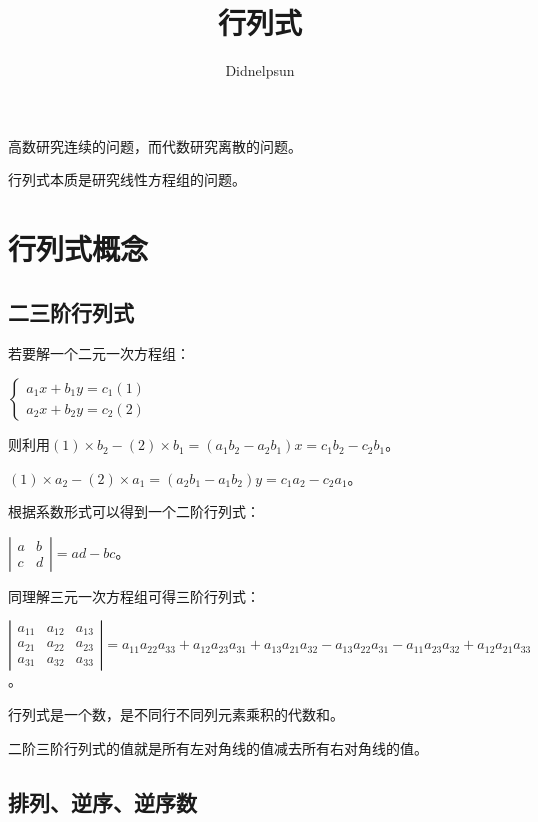 \documentclass[UTF8, 12pt]{ctexart}
\author{Didnelpsun}
\title{行列式}
\date{}
\begin{document}
\maketitle
\pagestyle{empty}
\thispagestyle{empty}
\tableofcontents
\thispagestyle{empty}
\newpage
\pagestyle{plain}
\setcounter{page}{1}

高数研究连续的问题，而代数研究离散的问题。

行列式本质是研究线性方程组的问题。

\section{行列式概念}

\subsection{二三阶行列式}

若要解一个二元一次方程组：

$\begin{cases}
    a_1x+b_1y=c_1 (1) \\
    a_2x+b_2y=c_2 (2) 
\end{cases}
$

则利用$(1)\times b_2-(2)\times b_1=(a_1b_2-a_2b_1)x=c_1b_2-c_2b_1$。

$(1)\times a_2-(2)\times a_1=(a_2b_1-a_1b_2)y=c_1a_2-c_2a_1$。

根据系数形式可以得到一个二阶行列式：

$
\left|\begin{array}{cc} 
    a & b \\
    c & d
\end{array}\right| 
=ad-bc$。

同理解三元一次方程组可得三阶行列式：

$
\left|\begin{array}{ccc} 
    a_{11} & a_{12} & a_{13} \\
    a_{21} & a_{22} & a_{23} \\
    a_{31} & a_{32} & a_{33}
\end{array}\right| 
=a_{11}a_{22}a_{33}+a_{12}a_{23}a_{31}+a_{13}a_{21}a_{32}-a_{13}a_{22}a_{31}-a_{11}a_{23}a_{32}+a_{12}a_{21}a_{33}$。

行列式是一个数，是不同行不同列元素乘积的代数和。

二阶三阶行列式的值就是所有左对角线的值减去所有右对角线的值。

\subsection{排列、逆序、逆序数}
\end{document}
